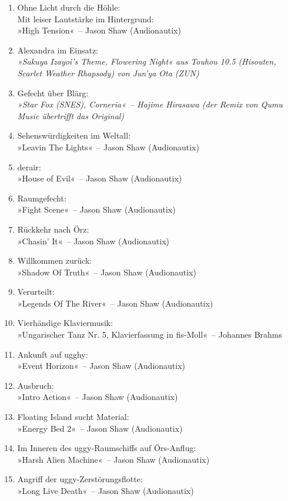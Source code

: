 \begin{enumerate}
    \item Ohne Licht durch die Höhle:\\ Mit leiser Lautstärke im Hintergrund:\\ »High Tension«~– Jason Shaw (Audionautix)
    \item Alexandra im Einsatz:\\  \textit{»Sakuya Izayoi's Theme, Flowering Night« aus Touhou 10.5 (Hisouten, Scarlet Weather Rhapsody) von Jun'ya Ota (ZUN)}
    \item Gefecht über Blärg:\\ \textit{»Star Fox (SNES), Corneria«~– Hajime Hirasawa (der Remix von Qumu Music übertrifft das Original)}
    \item Sehenswürdigkeiten im Weltall:\\ »Leavin The Lights«~– Jason Shaw (Audionautix)
    \item derair:\\ »House of Evil«~– Jason Shaw (Audionautix)
    \item Raumgefecht:\\ »Fight Scene«~– Jason Shaw (Audionautix)
    \item Rückkehr nach Örz:\\ »Chasin’ It«~– Jason Shaw (Audionautix)
    \item Willkommen zurück:\\ »Shadow Of Truth«~– Jason Shaw (Audionautix)
    \item Verurteilt:\\ »Legends Of The River«~– Jason Shaw (Audionautix)
    \item Vierhändige Klaviermusik:\\ »Ungarischer Tanz Nr. 5, Klavierfassung in fis-Moll«~– Johannes Brahms
    \item Ankunft auf ugghy:\\ »Event Horizon«~– Jason Shaw (Audionautix)
    \item Ausbruch:\\ »Intro Action«~– Jason Shaw (Audionautix)
    \item Floating Island sucht Material:\\ »Energy Bed 2«~– Jason Shaw (Audionautix)
    \item Im Inneren des uggy-Raumschiffs auf Örs-Anflug:\\ »Harsh Alien Machine«~– Jason Shaw (Audionautix)
    \item Angriff der uggy-Zerstörungsflotte:\\ »Long Live Death«~– Jason Shaw (Audionautix)

\end{enumerate}
